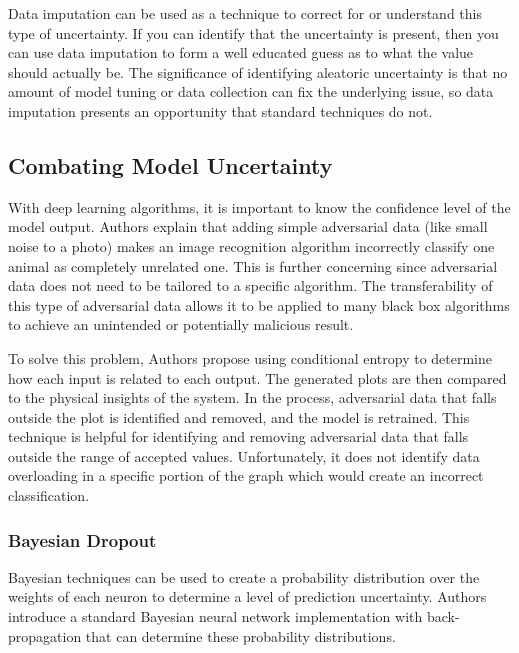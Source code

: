 Data imputation can be used as a technique to correct for or understand this type of uncertainty. If you can identify that the uncertainty is present, then you can use data imputation to form a well educated guess as to what the value should actually be. The significance of identifying aleatoric uncertainty is that no amount of model tuning or data collection can fix the underlying issue, so data imputation presents an opportunity that standard techniques do not.

\subsection{Combating Model Uncertainty}

With deep learning algorithms, it is important to know the confidence level of the model output.
Authors \cite{explaining-adversarial-examples} explain that adding simple adversarial data (like small noise to a photo) makes an image recognition algorithm incorrectly classify one animal as completely unrelated one.
This is further concerning since adversarial data does not need to be tailored to a specific algorithm.
The transferability of this type of adversarial data allows it to be applied to many black box algorithms to achieve an unintended or potentially malicious result.

To solve this problem, Authors \cite{black-box-explainability} propose using conditional entropy to determine how each input is related to each output.
The generated plots are then compared to the physical insights of the system.
In the process, adversarial data that falls outside the plot is identified and removed, and the model is retrained.
This technique is helpful for identifying and removing adversarial data that falls outside the range of accepted values.
Unfortunately, it does not identify data overloading in a specific portion of the graph which would create an incorrect classification.

\subsubsection{Bayesian Dropout}

Bayesian techniques can be used to create a probability distribution over the weights of each neuron to determine a level of prediction uncertainty.
Authors \cite{bayesian-weight-uncertainty-neural-networks} introduce a standard Bayesian neural network implementation with back-propagation that can determine these probability distributions.

